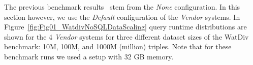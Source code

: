 %
%
The previous benchmark results~\cite{de2016big} stem from the \emph{None} configuration. In this section however, we use the \emph{Default} configuration of the \emph{Vendor} systems.
In Figure~\ref{fig:Fig01_WatdivNoSQLDataScaling} query runtime distributions are shown for the 4 \emph{Vendor} systems for three different dataset sizes of the WatDiv benchmark: 10M, 100M, and 1000M (million) triples. Note that for these benchmark runs we used a setup with 32 GB memory.
%
%
%  

